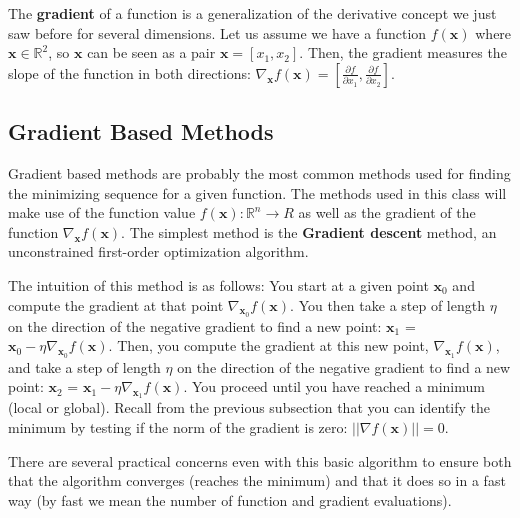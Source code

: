 The \textbf{gradient} of a function is a generalization of the derivative concept we just saw before for several dimensions. Let us assume we have a function  $f(\textbf{x})$ where $\textbf{x} \in \mathbb{R}^2$, so $\textbf{x}$ can be seen as a pair $\textbf{x} = [{x_1,x_2}]$. Then, the gradient measures the slope of the function in both directions: $\nabla_{\textbf{x}} f(\textbf{x}) = [\frac {\partial f}{\partial x_1},\frac {\partial f}{\partial x_2}]$.

\subsection{\label{gradient_methods} Gradient Based Methods}

Gradient based methods are probably the most common methods used for finding the minimizing sequence for a given function. The methods used in this class will make use of the function value $f(\textbf{x}): \mathbb{R}^{n}\rightarrow R $ as well as the gradient of the function $\nabla_{\textbf{x}} f(\textbf{x})$. The simplest method is the {\bf Gradient descent} method, an unconstrained first-order optimization algorithm.

The intuition of this method is as follows: You start at a given point $\textbf{x}_0$ and compute the gradient at that point $\nabla_{\textbf{x}_0} f(\textbf{x})$. You then take a step of length $\eta$ on the direction of the negative gradient to find a new point: $\textbf{x}_1$ = $\textbf{x}_0 - \eta \nabla_{\textbf{x}_{0}}
f(\textbf{x})$. Then, you compute the gradient at this new point, $\nabla_{\textbf{x}_1} f(\textbf{x})$, and take a step of length $\eta$ on the direction of the negative gradient to find a new point: $\textbf{x}_2$ = $\textbf{x}_1 - \eta \nabla_{\textbf{x}_{1}} f(\textbf{x})$. You proceed until you have reached a minimum (local or global). Recall from the previous subsection that you can identify the minimum by testing if the norm of the gradient is zero: $||\nabla f(\textbf{x})|| = 0$.

There are several practical concerns even with this basic algorithm to ensure both that the algorithm converges (reaches the minimum) and that it does so in a fast way (by fast we mean the number of function and gradient evaluations).

